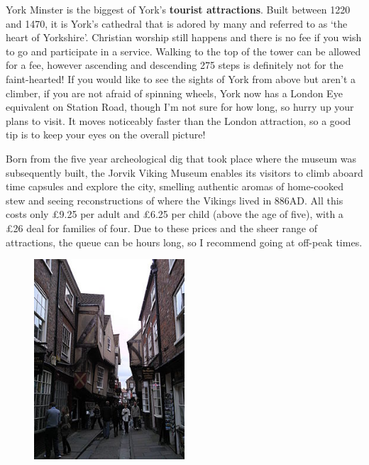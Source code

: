 \documentclass[11pt,a4paper]{article}
\begin{document}
York Minster is the biggest of York's \textbf{tourist attractions}.  Built between 1220 and 1470, it is York's cathedral that is adored by many and referred to as `the heart of Yorkshire'.  Christian worship still happens and there is no fee if you wish to go and participate in a service.  Walking to the top of the tower can be allowed for a fee, however ascending and descending 275 steps is definitely not for the faint-hearted!  If you would like to see the sights of York from above but aren't a climber, if you are not afraid of spinning wheels, York now has a London Eye equivalent on Station Road, though I'm not sure for how long, so hurry up your plans to visit.  It moves noticeably faster than the London attraction, so a good tip is to keep your eyes on the overall picture!

Born from the five year archeological dig that took place where the museum was subsequently built, the Jorvik Viking Museum enables its visitors to climb aboard time capsules and explore the city, smelling authentic aromas of home-cooked stew and seeing reconstructions of where the Vikings lived in 886AD.  All this costs only \pounds9.25 per adult and \pounds6.25 per child (above the age of five), with a \pounds26 deal for families of four.  Due to these prices and the sheer range of attractions, the queue can be hours long, so I recommend going at off-peak times.

\begin{figure}
  \vspace{-10pt}
  \begin{center}
    \includegraphics[width=0.50\textwidth]{shambles_overhangs_smaller}
  \end{center}
  \vspace{-20pt}
\end{figure}
\end{document}
